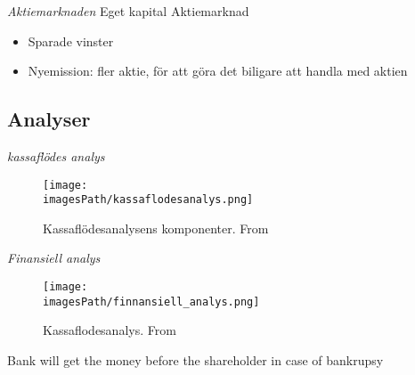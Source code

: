 \textit{Aktiemarknaden} \newline
Eget kapital Aktiemarknad
\begin{itemize}
    \item Sparade vinster 
    \item Nyemission: fler aktie, för att göra det biligare att handla med aktien
\end{itemize}

\subsection{Analyser}
\textit{kassaflödes analys}
\begin{figure}[!ht]
    \centering
    \texttt{[image: \\imagesPath/kassaflodesanalys.png]}
    \caption{Kassaflödesanalysens komponenter. From \cite{}}
\end{figure}

\textit{Finansiell analys}
\begin{figure}[!ht]
    \centering
    \texttt{[image: \\imagesPath/finnansiell\_analys.png]}
    \caption{Kassaflodesanalys. From \cite{}}
\end{figure}

Bank will get the money before the shareholder in case of bankrupsy

